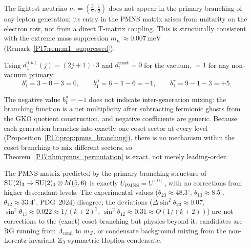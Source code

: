 \begin{corollary}
\label{P17:cor:nu1_orphan}
The lightest neutrino $\nu_1=(\tfrac32,\tfrac12)$ does not appear in the
primary branching of any lepton generation; its entry in the PMNS matrix
arises from unitarity on the electron row, not from a direct T-matrix
coupling. This is structurally consistent with the extreme mass
suppression $m_{\nu_1}\approx0.007\,\mathrm{meV}$
(Remark~\ref{P17:rem:m1_suppressed}).
\end{corollary}

\begin{proposition}
\label{P17:prop:pmns_b1}
Using $d_1^{(k)}(j)=(2j+1)\cdot3$ and $d_1^{\mathrm{coset}}=0$ for the
vacuum, $=1$ for any non-vacuum primary:
\begin{equation}
  b_1^e = 3-0-3 = 0, \qquad
  b_1^\mu = 6-1-6 = -1, \qquad
  b_1^\tau = 9-1-3 = +5.
\end{equation}
\end{proposition}

\begin{remark}
\label{P17:rem:b1_sign}
The negative value $b_1^\mu=-1$ does not indicate inter-generation
mixing: the branching function is a net multiplicity after subtracting
fermionic ghosts from the GKO quotient construction, and negative
coefficients are generic. Because each generation branches into exactly
one coset sector at every level (Proposition~\ref{P17:prop:pmns_branching}),
there is no mechanism within the coset branching to mix different
sectors, so Theorem~\ref{P17:thm:pmns_permutation} is exact, not merely
leading-order.
\end{remark}

\begin{corollary}
\label{P17:cor:pmns_exact}
The PMNS matrix predicted by the primary branching structure of
$\mathrm{SU}(2)_3\to\mathrm{SU}(2)_1\otimes M(5,6)$ is exactly $U_{\mathrm{PMNS}}=U^{(0)}$,
with no corrections from higher descendant levels. The experimental
values ($\theta_{23}\approx48.3^\circ$, $\theta_{13}\approx8.5^\circ$,
$\theta_{12}\approx33.4^\circ$, PDG~2024) disagree; the deviations
($\Delta\sin^2\theta_{23}\approx0.07$, $\sin^2\theta_{13}\approx0.022
\approx1/(k+2)^2$, $\sin^2\theta_{12}\approx0.31\approx O(1/(k+2))$)
are not corrections to the (exact) coset branching but physics beyond
it: candidates are RG running from $\Lambda_{\mathrm{cond}}$ to $m_Z$,
or condensate background mixing from the non-Lorentz-invariant
$\mathbb{Z}_3$-symmetric Hopfion condensate.
\end{corollary}

